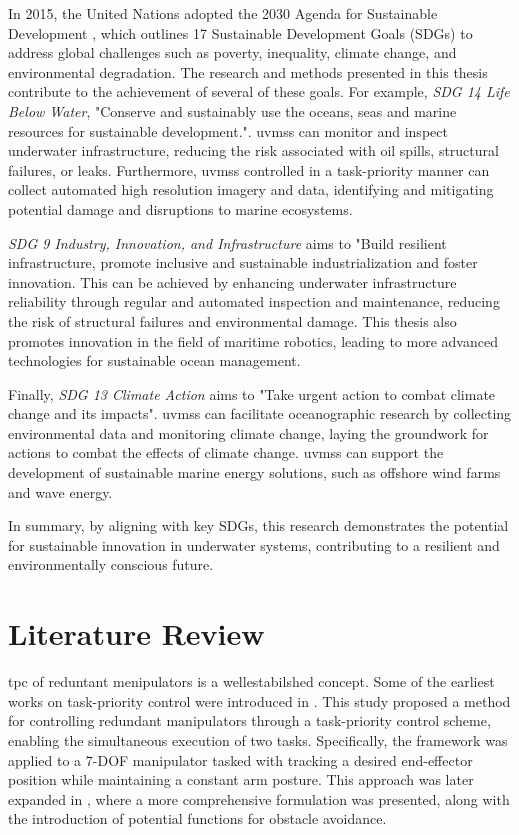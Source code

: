 In 2015, the United Nations adopted the 2030 Agenda for Sustainable Development
\cite{UN2030Agenda}, which outlines 17 Sustainable Development Goals (SDGs) to
address global challenges such as poverty, inequality, climate change, and
environmental degradation. The research and methods presented in this thesis
contribute to the achievement of several of these goals. For example, \emph{SDG 14
Life Below Water}, "Conserve and sustainably use the oceans, seas and marine
resources for sustainable development.". \gls{uvms}s can monitor and inspect underwater
infrastructure, reducing the risk associated with oil spills, structural failures,
or leaks. Furthermore, \gls{uvms}s controlled in a task-priority manner can collect automated
high resolution imagery and data, identifying and mitigating potential
damage and disruptions to marine ecosystems.

\emph{SDG 9 Industry, Innovation, and Infrastructure} aims to "Build resilient
infrastructure, promote inclusive and sustainable industrialization and foster
innovation. This can be achieved by enhancing underwater infrastructure reliability
through regular and automated inspection and maintenance, reducing the risk of
structural failures and environmental damage. This thesis also promotes innovation
in the field of maritime robotics, leading to more advanced technologies for
sustainable ocean management.

Finally, \emph{SDG 13 Climate Action} aims to "Take urgent action to combat climate
change and its impacts". \gls{uvms}s can facilitate oceanographic research by collecting
environmental data and monitoring climate change, laying the groundwork for actions
to combat the effects of climate change. \gls{uvms}s can support the development of
sustainable marine energy solutions, such as offshore wind farms and wave energy.

In summary, by aligning with key SDGs, this research demonstrates the potential
for sustainable innovation in underwater systems, contributing to a resilient 
and environmentally conscious future.

\section{Literature Review}
\label{sec:introduction:literature}

\gls{tpc} of reduntant menipulators is a wellestabilshed concept.
Some of the earliest works on task-priority control were introduced in 
\cite{hanafusa1981}. This study proposed a method for controlling redundant 
manipulators through a task-priority control scheme, enabling the simultaneous 
execution of two tasks. Specifically, the framework was applied to a 7-DOF 
manipulator tasked with tracking a desired end-effector position while 
maintaining a constant arm posture. This approach was later expanded in 
\cite{nakamura1987}, where a more comprehensive formulation was presented, 
along with the introduction of potential functions for obstacle avoidance.

